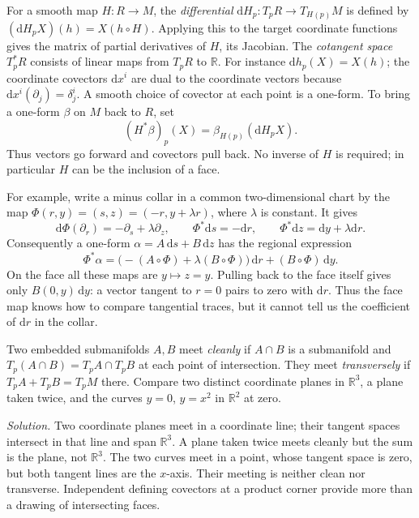 For a smooth map $H:R\to M$, the \emph{differential} $\mathrm{d}H_p:T_p R\to T_{H(p)}M$ is defined by $(\mathrm{d}H_p X)(h)=X(h\circ H)$. Applying this to the target coordinate functions gives the matrix of partial derivatives of $H$, its Jacobian. The \emph{cotangent space} $T_p^*R$ consists of linear maps from $T_p R$ to $\mathbb R$. For instance $\mathrm{d}h_p(X)=X(h)$; the coordinate covectors $\mathrm{d}x^i$ are dual to the coordinate vectors because $\mathrm{d}x^i(\partial_j)=\delta^i_j$. A smooth choice of covector at each point is a one-form. To bring a one-form $\beta$ on $M$ back to $R$, set
\[
 {(H^*\beta)}_p(X)=\beta_{H(p)}(\mathrm{d}H_p X).
\]
Thus vectors go forward and covectors pull back. No inverse of $H$ is required; in particular $H$ can be the inclusion of a face.

For example, write a minus collar in a common two-dimensional chart by the map $\Phi(r,y)=(s,z)=(-r,y+\lambda r)$, where $\lambda$ is constant. It gives
\[
 \mathrm{d}\Phi(\partial_r)=-\partial_s+\lambda\partial_z,
 \qquad \Phi^*\mathrm{d}s=-\mathrm{d}r,\qquad
 \Phi^*\mathrm{d}z=\mathrm{d}y+\lambda\mathrm{d}r .
\]
Consequently a one-form $\alpha=A\,\mathrm{d}s+B\,\mathrm{d}z$ has the regional expression
\[
 \Phi^*\alpha=\bigl(-(A\circ\Phi)+\lambda(B\circ\Phi)\bigr)\,\mathrm{d}r
                  +(B\circ\Phi)\,\mathrm{d}y .
\]
On the face all these maps are $y\mapsto z=y$. Pulling back to the face itself gives only $B(0,y)\,\mathrm{d}y$: a vector tangent to $r=0$ pairs to zero with $\mathrm{d}r$. Thus the face map knows how to compare tangential traces, but it cannot tell us the coefficient of $\mathrm{d}r$ in the collar.

\begin{exercise}
Two embedded submanifolds $A,B$ meet \emph{cleanly} if $A\cap B$ is a submanifold and $T_p(A\cap B)=T_pA\cap T_pB$ at each point of intersection. They meet \emph{transversely} if $T_pA+T_pB=T_pM$ there. Compare two distinct coordinate planes in $\mathbb R^3$, a plane taken twice, and the curves $y=0$, $y=x^2$ in $\mathbb R^2$ at zero.
\end{exercise}
\noindent\emph{Solution.} Two coordinate planes meet in a coordinate line; their tangent spaces intersect in that line and span $\mathbb R^3$. A plane taken twice meets cleanly but the sum is the plane, not $\mathbb R^3$. The two curves meet in a point, whose tangent space is zero, but both tangent lines are the $x$-axis. Their meeting is neither clean nor transverse. Independent defining covectors at a product corner provide more than a drawing of intersecting faces.

